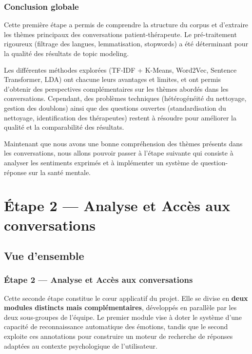 \documentclass[12pt,a4paper]{report}
\begin{document}
\pagebreak

\section{Conclusion globale}

Cette première étape a permis de comprendre la structure du corpus et d'extraire les thèmes
principaux des conversations patient-thérapeute. Le pré-traitement rigoureux (filtrage des
langues, lemmatisation, stopwords) a été déterminant pour la qualité des résultats de topic
modeling.

Les différentes méthodes explorées (TF-IDF + K-Means, Word2Vec, Sentence Transformer, LDA) ont chacune leurs avantages et limites,
et ont permis d'obtenir des perspectives complémentaires sur les thèmes abordés dans les conversations.
Cependant, des problèmes techniques (hétérogénéité du nettoyage, gestion des doublons)
ainsi que des questions ouvertes (standardisation du nettoyage, identification des thérapeutes) 
restent à résoudre pour améliorer la qualité et la comparabilité des résultats.

Maintenant que nous avons une bonne compréhension des thèmes présents dans les conversations, 
nous allons pouvoir passer à l'étape suivante qui consiste à analyser les sentiments exprimés 
et à implémenter un système de question-réponse sur la santé mentale.

\part{Étape 2 — Analyse et Accès aux conversations}

\chapter{Vue d'ensemble}
\section{Étape 2 — Analyse et Accès aux conversations}

Cette seconde étape constitue le cœur applicatif du projet. Elle se divise en \textbf{deux modules distincts mais complémentaires}, développés en parallèle par les deux sous-groupes de l'équipe. Le premier module vise à doter le système d'une capacité de reconnaissance automatique des émotions, tandis que le second exploite ces annotations pour construire un moteur de recherche de réponses adaptées au contexte psychologique de l'utilisateur.
\end{document}
